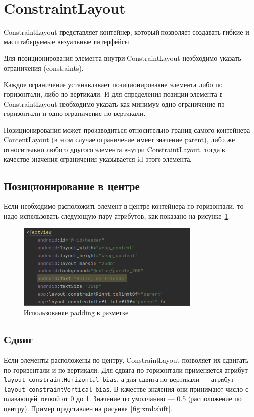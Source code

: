 \section{ConstraintLayout}
ConstraintLayout представляет контейнер, который позволяет создавать
гибкие и масштабируемые визуальные интерфейсы.\par
Для позиционирования элемента внутри ConstraintLayout необходимо указать
ограничения (constraints).\par
Каждое ограничение устанавливает позиционирование элемента либо по
горизонтали, либо по вертикали. И для определения позиции элемента в
ConstraintLayout необходимо указать как минимум одно ограничение по
горизонтали и одно ограничение по вертикали.\par
Позиционирования может производиться относительно границ самого
контейнера ContentLayout (в этом случае ограничение имеет значение parent),
либо же относительно любого другого элемента внутри ConstraintLayout,
тогда в качестве значения ограничения указывается id этого элемента.\par

\subsection{Позиционирование в центре}
Если необходимо расположить элемент в центре контейнера по горизонтали,
то надо использовать следующую пару атрибутов, как показано на
рисунке~\ref{fig:xml:pos:cent}.

\begin{figure}[h!tp]
	\centering
	\includegraphics[width=0.8\textwidth]{Screenshot from 2023-03-11 18-44-28.png}
	\caption{Использование padding в разметке}
	\label{fig:xml:pos:cent}
\end{figure}

\subsection{Сдвиг}
Если элементы расположены по центру, ConstraintLayout позволяет их
сдвигать по горизонтали и по вертикали. Для сдвига по горизонтали
применяется атрибут \texttt{layout\_constraintHorizontal\_bias},
а для сдвига по вертикали --- атрибут
\texttt{layout\_constraintVertical\_bias}.
В качестве значения они принимают число с плавающей точкой от 0 до 1.
Значение по умолчанию --- 0.5 (расположение по центру). Пример представлен
на рисунке~\ref{fig:xml:shift}.

